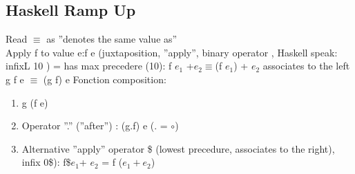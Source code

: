 \documentclass{article}
\begin{document}
\subsection{Haskell Ramp Up}
Read $\equiv$ as ''denotes the same value as''\\
Apply f to value e:\quad f \textvisiblespace e (juxtaposition, ''apply'', binary operator \textvisiblespace, Haskell speak: infixL 10 \textvisiblespace)
= \textvisiblespace has max precedere (10): f $e_1$ +$e_2 \equiv $(f $e_1$) + $e_2$
\textvisiblespace associates to the left g \textvisiblespace f \textvisiblespace e $\equiv$ (g f) e
Fonction composition:
\begin{enumerate}[-]
\item g (f e)
\item Operator ''.'' (''after'') : (g.f) e (. = $\circ$)
\item Alternative ''apply'' operator \$ (lowest precedure, associates to the right), infix 0\$): f\$$e_1$+ $e_2$ = f ($e_1 + e_2$)
\end{enumerate}
\end{document}
